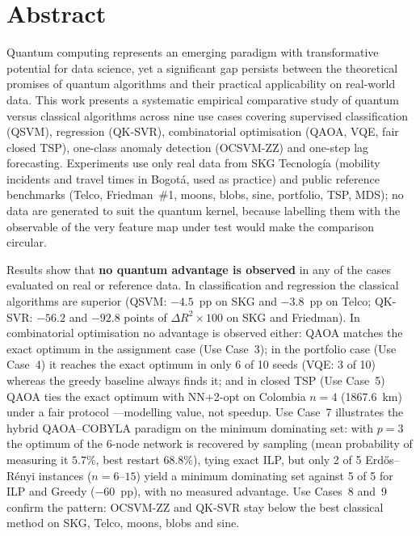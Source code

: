 \chapter{Abstract}

Quantum computing represents an emerging paradigm with transformative potential for data science, yet a significant gap persists between the theoretical promises of quantum algorithms and their practical applicability on real-world data. This work presents a systematic empirical comparative study of quantum versus classical algorithms across nine use cases covering supervised classification (QSVM), regression (QK-SVR), combinatorial optimisation (QAOA, VQE, fair closed TSP), one-class anomaly detection (OCSVM-ZZ) and one-step lag forecasting. Experiments use only real data from SKG Tecnología (mobility incidents and travel times in Bogotá, used as practice) and public reference benchmarks (Telco, Friedman~\#1, moons, blobs, sine, portfolio, TSP, MDS); no data are generated to suit the quantum kernel, because labelling them with the observable of the very feature map under test would make the comparison circular.

Results show that \textbf{no quantum advantage is observed} in any of the cases evaluated on real or reference data. In classification and regression the classical algorithms are superior (QSVM: $-4.5$~pp on SKG and $-3.8$~pp on Telco; QK-SVR: $-56.2$ and $-92.8$ points of $\Delta R^2\times100$ on SKG and Friedman). In combinatorial optimisation no advantage is observed either: QAOA matches the exact optimum in the assignment case (Use Case~3); in the portfolio case (Use Case~4) it reaches the exact optimum in only 6 of 10 seeds (VQE: 3 of 10) whereas the greedy baseline always finds it; and in closed TSP (Use Case~5) QAOA ties the exact optimum with NN+2-opt on Colombia $n=4$ (1867.6~km) under a fair protocol ---modelling value, not speedup. Use Case~7 illustrates the hybrid QAOA--COBYLA paradigm on the minimum dominating set: with $p=3$ the optimum of the 6-node network is recovered by sampling (mean probability of measuring it $5.7\%$, best restart $68.8\%$), tying exact ILP, but only 2 of 5 Erd\H{o}s--R\'enyi instances ($n=6$--$15$) yield a minimum dominating set against 5 of 5 for ILP and Greedy ($-60$~pp), with no measured advantage. Use Cases~8 and~9 confirm the pattern: OCSVM-ZZ and QK-SVR stay below the best classical method on SKG, Telco, moons, blobs and sine.

